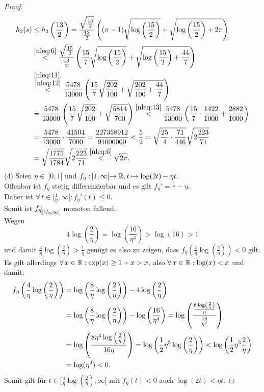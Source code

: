 \begin{proof}
\begin{align*}
h_2(s)&\le h_2\left(\frac{13}2\right) = \frac{\sqrt{\frac{15}2}}{\frac{13}{2}}
\left((\pi-1)\sqrt{\log\left(\frac{15}2 \right)} 
 + \sqrt{\log\left(\frac{15}2 \right) + 2\pi} \right)\\
 &\overset{\eqref{nleq:6}}<\frac{\sqrt{\frac{15}2}}{\frac{13}{2}}
\left(\frac{15}7\sqrt{\log\left(\frac{15}2 \right)} 
 + \sqrt{\log\left(\frac{15}2 \right) + \frac{44}7} \right)\\
& \overset{\substack{\eqref{nleq:11},\\\eqref{nleq:12}}}<\frac{5478}{13000}
 \left(\frac{15}7\sqrt{\frac{202}{100}} 
 + \sqrt{\frac{202}{100} + \frac{44}7} \right)\\
 &= \frac{5478}{13000}
 \left(\frac{15}7\sqrt{\frac{202}{100}}
 + \sqrt{\frac{5814}{700}}\right)
 \overset{\eqref{nleq:13}}< \frac{5478}{13000}
 \left(\frac{15}7 \cdot \frac{1422}{1000}
 + \frac{2882}{1000}\right)\\&= \frac{5478}{13000}\cdot\frac{41504}{7000}
 = \frac{227358912}{91000000}<\frac 5 2 
 =\sqrt{\frac{25}4 \cdot \frac{71}{446}}\sqrt{2 \frac{223}{71}}\\
 &= \sqrt{\frac{1775}{1784}}\sqrt{2 \frac{223}{71}}\overset{\eqref{nleq:6}}<
  \sqrt{2\pi}
 \text.
\end{align*}
(4) Seien $\eta \in\!\  ]0, 1[$ und $f_\eta:\!\  ]1, \infty[ \rightarrow \mathbb{R},
t \mapsto \log(2t)-\eta t$.\\
Offenbar ist $f_\eta$ stetig differenzierbar und es gilt
$f_\eta'=\frac 1\cdot- \eta$.\\
Daher ist $\forall\, t \in [\frac 1 \eta, \infty[: f_\eta'(t) \le 0$.\\
Somit ist $\restrict{f_\eta}{[\nicefrac 1 \eta, \infty[}$ monoton fallend.\\
Wegen
\[4\log\left(\frac 2 \eta \right) = \log\left(\frac{16}{\eta^4} \right)
> \log(16) > 1\]
und damit $\frac 4 \eta \log\left(\frac 2 \eta\right) > \frac 1 \eta$ genügt es
also zu zeigen, dass
$f_\eta\left(\frac 4\eta\log\left(\frac 2 \eta\right)\right)<0$
gilt.\\
Es gilt allerdings $\forall\, x \in \mathbb{R}: \exp(x) \ge 1+x > x$, also
$\forall\, x \in \mathbb{R}: \log(x) < x$ und damit:
\begin{align*}
f_\eta\left(\frac 4 \eta \log\left(\frac 2 \eta\right) \right) & =
\log\left(\frac 8 \eta \log\left(\frac 2 \eta\right) \right)
 -4\log\left(\frac 2 \eta\right)\\
&= \log\left(\frac 8 \eta \log\left(\frac 2 \eta\right) \right)
  -\log\left(\frac{16}{\eta^4} \right)
  = \log\left(\frac{\frac{8 \log\left(\frac 2 \eta\right)}{\eta}}
    {\frac{16}{\eta^4}} \right)\\
&= \log\left(\frac{8\eta^4\log\left(\frac 2 \eta \right)}{16\eta} \right)
= \log\left(\frac 1 2 \eta^3 \log\left(\frac{2}{\eta} \right) \right)
< \log\left(\frac 1 2 \eta ^3 \frac 2 \eta \right)\\
& = \log(\eta^2) < 0\text.
\end{align*}
Somit gilt für
$t \in \bigg[\frac 4 \eta \log\left(\frac 2 \eta\right),\infty  \bigg[$ mit
$f_\eta(t)< 0$ auch $\log(2t)< \eta t$.
\end{proof}